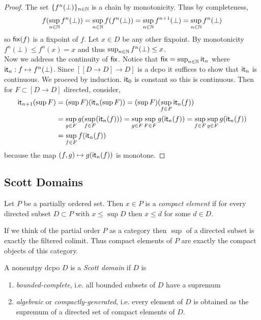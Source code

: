 \documentclass[12pt]{article}
\begin{document}
\begin{proof}
The set $\{ f^n(\bot) \}_{n \in \N}$ is a chain by monotonicity. Thus by completeness,
\[ f(\sup_{n \in \N} f^n(\bot)) = \sup_{n \in \N} f(f^n(\bot)) = \sup_{n \in \N} f^{n+1}(\bot) = \sup_{n \in \N} f^n(\bot) \]
so $\fix(f)$ is a fixpoint of $f$. Let $x \in D$ be any other fixpoint. By monotonicity $f^n(\bot) \le f^n(x) = x$ and thus $\sup_{n \in \N} f^n(\bot) \le x$.
\bigskip\\
Now we address the continuity of $\fix$. Notice that $\fix = \sup_{n \in \N} \it_n$ where $\it_n : f \mapsto f^n(\bot)$. Since $[[D \to D] \to D]$ is a dcpo it suffices to show that $\it_n$ is continuous. We proceed by induction. $\it_0$ is constant so this is continuous. Then for $F \subset [D \to D]$ directed, consider,
\begin{align*}
\it_{n+1}(\sup F) & = (\sup F)(\it_n(\sup F)) = (\sup F)(\sup_{f \in F} \it_n(f)) 
\\
& = \sup_{g \in F} g (\sup_{f \in F}(\it_n(f))) = \sup_{g \in F} \sup_{F \in F} g(\it_n(f)) = \sup_{f \in F} \sup_{g \in F} g(\it_n(f))
\\
& = \sup_{f \in F} f(\it_n(f)) 
\end{align*}
because the map $(f, g) \mapsto g(\it_n(f))$ is monotone. 
\end{proof}

\subsection{Scott Domains}

\begin{defn}
Let $P$ be a partially ordered set. Then $x \in P$ is a \textit{compact element} if for every directed subset $D \subset P$ with $x \le \sup{D}$ then $x \le d$ for some $d \in D$.
\end{defn}

\begin{rmk}
If we think of the partial order $P$ as a category then $\sup$ of a directed subset is exactly the filtered colimit. Thus compact elements of $P$ are exactly the compact objects of this category.
\end{rmk}

\begin{defn}
A nonemtpy dcpo $D$ is a \textit{Scott domain} if $D$ is 
\begin{enumerate}
\item \textit{bounded-complete}, i.e. all bounded subsets of $D$ have a supremum
\item \textit{algebraic} or \textit{compactly-generated}, i.e. every element of $D$ is obtained as the supremum of a directed set of compact elements of $D$.
\end{enumerate}
\end{defn}
\end{document}

